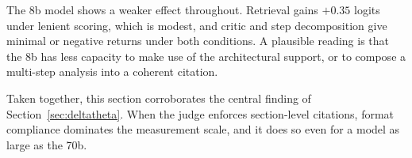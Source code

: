 The 8b model shows a weaker effect throughout. Retrieval gains $+0.35$
logits under lenient scoring, which is modest, and critic and step
decomposition give minimal or negative returns under both conditions. A
plausible reading is that the 8b has less capacity to make use of the
architectural support, or to compose a multi-step analysis into a
coherent citation.

Taken together, this section corroborates the central finding of
Section~\ref{sec:deltatheta}. When the judge enforces section-level
citations, format compliance dominates the measurement scale, and it does
so even for a model as large as the 70b.
